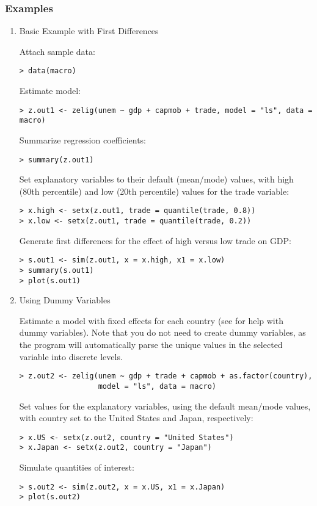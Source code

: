 \subsubsection{Examples}\begin{enumerate}
\item Basic Example with First Differences

Attach sample data:
\begin{verbatim}
> data(macro)
\end{verbatim}
Estimate model:
\begin{verbatim}
> z.out1 <- zelig(unem ~ gdp + capmob + trade, model = "ls", data = macro)
\end{verbatim}
Summarize regression coefficients:
\begin{verbatim}
> summary(z.out1)
\end{verbatim}
Set explanatory variables to their default (mean/mode) values, with
high (80th percentile) and low (20th percentile) values for the trade variable:
\begin{verbatim}
> x.high <- setx(z.out1, trade = quantile(trade, 0.8))
> x.low <- setx(z.out1, trade = quantile(trade, 0.2))
\end{verbatim}
Generate first differences for the effect of high versus low trade on
GDP:
\begin{verbatim}
> s.out1 <- sim(z.out1, x = x.high, x1 = x.low)
> summary(s.out1)
> plot(s.out1)
\end{verbatim}

\item Using Dummy Variables

Estimate a model with fixed effects for each country (see
 for help with dummy variables).  Note that you do not
need to create dummy variables, as the program will automatically
parse the unique values in the selected variable into discrete levels.  
\begin{verbatim}
> z.out2 <- zelig(unem ~ gdp + trade + capmob + as.factor(country), 
                  model = "ls", data = macro)
\end{verbatim}   
Set values for the explanatory variables, using the default mean/mode
values, with country set to the United States and Japan, respectively:
\begin{verbatim}
> x.US <- setx(z.out2, country = "United States")
> x.Japan <- setx(z.out2, country = "Japan")
\end{verbatim}   
Simulate quantities of interest:
\begin{verbatim}
> s.out2 <- sim(z.out2, x = x.US, x1 = x.Japan)
> plot(s.out2)
\end{verbatim}
\end{enumerate}

